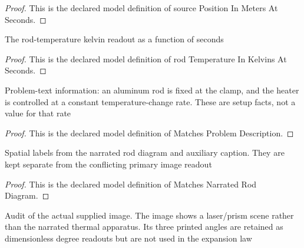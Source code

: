 \begin{proof}
  This is the declared model definition of source Position In Meters At Seconds.
\end{proof}
\begin{definition}
  \label{def:physics:phyx-mini-0156:phyxminiproblems-problemphyxmini0156-rodtemperatureinkelvinsatseconds}
  The rod-temperature kelvin readout as a function of seconds
\end{definition}
\begin{proof}
  This is the declared model definition of rod Temperature In Kelvins At Seconds.
\end{proof}
\begin{definition}
  \label{def:physics:phyx-mini-0156:phyxminiproblems-problemphyxmini0156-matchesproblemdescription}
  Problem-text information: an aluminum rod is fixed at the clamp, and the heater is controlled at a constant temperature-change rate. These are setup facts, not a value for that rate
\end{definition}
\begin{proof}
  This is the declared model definition of Matches Problem Description.
\end{proof}
\begin{definition}
  \label{def:physics:phyx-mini-0156:phyxminiproblems-problemphyxmini0156-matchesnarratedroddiagram}
  Spatial labels from the narrated rod diagram and auxiliary caption. They are kept separate from the conflicting primary image readout
\end{definition}
\begin{proof}
  This is the declared model definition of Matches Narrated Rod Diagram.
\end{proof}
\begin{definition}
  \label{def:physics:phyx-mini-0156:phyxminiproblems-problemphyxmini0156-recordsprovidedfiguremismatch}
  Audit of the actual supplied image. The image shows a laser/prism scene rather than the narrated thermal apparatus. Its three printed angles are retained as dimensionless degree readouts but are not used in the expansion law
\end{definition}
